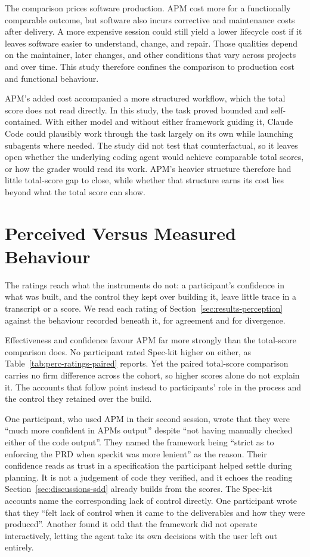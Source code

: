 The comparison prices software production. APM cost more for a functionally comparable outcome, but software also incurs corrective and maintenance costs after delivery. A more expensive session could still yield a lower lifecycle cost if it leaves software easier to understand, change, and repair. Those qualities depend on the maintainer, later changes, and other conditions that vary across projects and over time. This study therefore confines the comparison to production cost and functional behaviour.

APM's added cost accompanied a more structured workflow, which the total score does not read directly. In this study, the task proved bounded and self-contained. With either model and without either framework guiding it, Claude Code could plausibly work through the task largely on its own while launching subagents where needed. The study did not test that counterfactual, so it leaves open whether the underlying coding agent would achieve comparable total scores, or how the grader would read its work. APM's heavier structure therefore had little total-score gap to close, while whether that structure earns its cost lies beyond what the total score can show.

\section{Perceived Versus Measured Behaviour}
\label{sec:discussions-perception}


The ratings reach what the instruments do not: a participant's confidence in what was built, and the control they kept over building it, leave little trace in a transcript or a score. We read each rating of Section~\ref{sec:results-perception} against the behaviour recorded beneath it, for agreement and for divergence.

Effectiveness and confidence favour APM far more strongly than the total-score comparison does. No participant rated Spec-kit higher on either, as Table~\ref{tab:perc-ratings-paired} reports. Yet the paired total-score comparison carries no firm difference across the cohort, so higher scores alone do not explain it. The accounts that follow point instead to participants' role in the process and the control they retained over the build.

One participant, who used APM in their second session, wrote that they were ``much more confident in APMs output'' despite ``not having manually checked either of the code output''. They named the framework being ``strict as to enforcing the PRD when speckit was more lenient'' as the reason. Their confidence reads as trust in a specification the participant helped settle during planning. It is not a judgement of code they verified, and it echoes the reading Section~\ref{sec:discussions-sdd} already builds from the scores. The Spec-kit accounts name the corresponding lack of control directly. One participant wrote that they ``felt lack of control when it came to the deliverables and how they were produced''. Another found it odd that the framework did not operate interactively, letting the agent take its own decisions with the user left out entirely.

